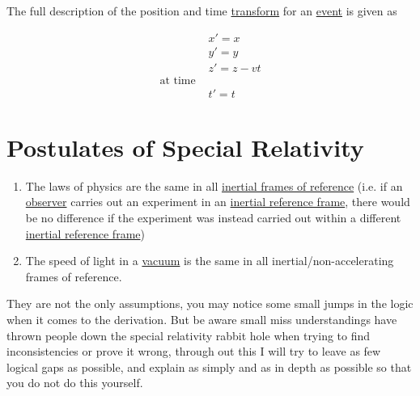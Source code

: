 The full description of the position and time \hyperlink{def-transform}{transform} for an \hyperlink{def-event}{event} is given as

\begin{equation}%
	\begin{aligned}
		 & x'=x               \\ & y'=y \\ &z' = z-vt  \\
		\text{at time \ \ \ } \\
		 & t'= t
	\end{aligned}
	\label{eq: Galilean transformation}
\end{equation}%


\section{Postulates of Special Relativity}%

\begin{tcolorbox}[breakable]
	\begin{enumerate}
		\item The laws of physics are the same in all \hyperlink{def-Inertial-reference-frame}{inertial frames of reference} (i.e. if an \hyperlink{def-observer}{observer} carries out an experiment in an \hyperlink{def-Inertial-reference-frame}{inertial reference frame}, there would be no difference if the experiment was instead carried out within a different \hyperlink{def-Inertial-reference-frame}{inertial reference frame})
		\item The speed of light in a \hyperlink{def-vacuum}{vacuum} is the same in all inertial/non-accelerating frames of reference.
	\end{enumerate}
\end{tcolorbox}

They are not the only assumptions, you may notice some small jumps in the logic when it comes to the derivation. But be aware small miss understandings have thrown people down the special relativity rabbit hole when trying to find inconsistencies or prove it wrong, through out this I will try to leave as few logical gaps as possible, and explain as simply and as in depth as possible so that you do not do this yourself.


